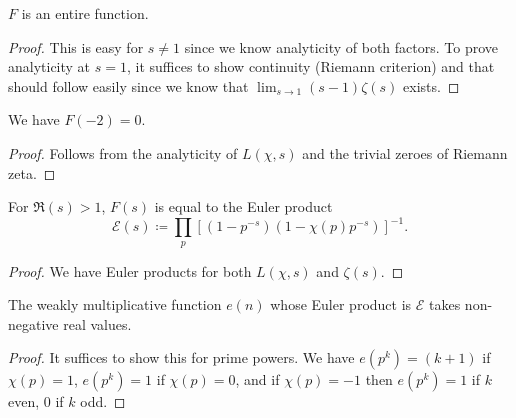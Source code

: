  \begin{lemma}
  $F$ is an entire function.
 \end{lemma}

 \begin{proof}
  This is easy for $s \ne 1$ since we know analyticity of both factors. To prove analyticity at $s = 1$, it suffices to show continuity (Riemann criterion) and that should follow easily since we know that $\lim_{s \to 1} (s - 1) \zeta(s)$ exists.
 \end{proof}

 \begin{lemma}
  We have $F(-2) = 0$.
 \end{lemma}

 \begin{proof}
  Follows from the analyticity of $L(\chi, s)$ and the trivial zeroes of Riemann zeta.
 \end{proof}

 \begin{lemma}
  For $\Re(s) > 1$, $F(s)$ is equal to the Euler product
  \[ \mathcal{E}(s) \coloneqq \prod_p \left[ (1 - p^{-s}) (1 - \chi(p) p^{-s})\right]^{-1}. \]
 \end{lemma}

 \begin{proof}
  We have Euler products for both $L(\chi, s)$ and $\zeta(s)$.
 \end{proof}

 \begin{lemma}
  The weakly multiplicative function $e(n)$ whose Euler product is $\mathcal{E}$ takes non-negative real values.
 \end{lemma}

 \begin{proof}
  It suffices to show this for prime powers. We have $e(p^k) = (k + 1)$ if $\chi(p) = 1$, $e(p^k) = 1$ if $\chi(p) = 0$, and if $\chi(p) = -1$ then $e(p^k) = 1$ if $k$ even, $0$ if $k$ odd.
 \end{proof}

